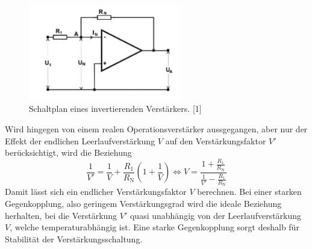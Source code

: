 \documentclass{scrartcl}
\begin{document}
\begin{figure}[!h]
\centering
\includegraphics[width=0.6\textwidth]{invertierender}
\caption{Schaltplan eines invertierenden Verstärkers. [1]}
\label{verstaerker}
\end{figure}
Wird hingegen von einem realen Operationsverstärker aussgegangen, aber nur der Effekt der endlichen Leerlaufverstärkung $V$ auf den Verstärkungsfaktor $V'$ berücksichtigt, wird die Beziehung
\begin{equation}
  \frac{1}{V'} = \frac{1}{V} + \frac{R_1}{R_\mathrm{N}} \left(1+\frac{1}{V}\right)
  \iff V = \frac{1 + \frac{R_1}{R_\text{N}}}{\frac{1}{V'}-\frac{R_1}{R_\text{N}}}
  \label{lappen1}
\end{equation}
Damit lässt sich ein endlicher Verstärkungsfaktor $V$ berechnen.
Bei einer starken Gegenkopplung, also geringem Verstärkungsgrad wird die ideale Beziehung herhalten, bei die Verstärkung $V'$ quasi unabhängig von der Leerlaufverstärkung $V$, welche temperaturabhängig ist.
Eine starke Gegenkopplung sorgt deshalb für Stabilität der Verstärkungsschaltung.
\end{document}
